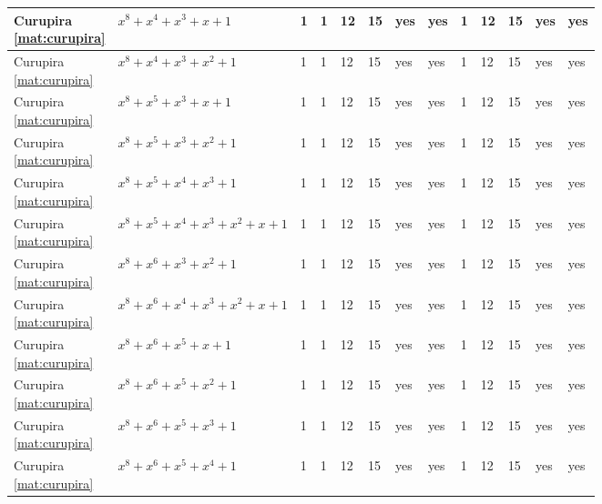 \begin{tiny}
\begin{longtable}{|l|l|l|l|l|l|l|l|l|l|l|l|l|}
\shortstack{Curupira \\ \eqref{mat:curupira}} & $x^8 + x^4 + x^3 + x + 1$ & 1 & 1 & 12 & 15 & yes & yes & 1 & 12 & 15 & yes & yes \\ \hline
\shortstack{Curupira \\ \eqref{mat:curupira}} & $x^8 + x^4 + x^3 + x^2 + 1$ & 1 & 1 & 12 & 15 & yes & yes & 1 & 12 & 15 & yes & yes \\ \hline
\shortstack{Curupira \\ \eqref{mat:curupira}} & $x^8 + x^5 + x^3 + x + 1$ & 1 & 1 & 12 & 15 & yes & yes & 1 & 12 & 15 & yes & yes \\ \hline
\shortstack{Curupira \\ \eqref{mat:curupira}} & $x^8 + x^5 + x^3 + x^2 + 1$ & 1 & 1 & 12 & 15 & yes & yes & 1 & 12 & 15 & yes & yes \\ \hline
\shortstack{Curupira \\ \eqref{mat:curupira}} & $x^8 + x^5 + x^4 + x^3 + 1$ & 1 & 1 & 12 & 15 & yes & yes & 1 & 12 & 15 & yes & yes \\ \hline
\shortstack{Curupira \\ \eqref{mat:curupira}} & $x^8 + x^5 + x^4 + x^3 + x^2 + x + 1$ & 1 & 1 & 12 & 15 & yes & yes & 1 & 12 & 15 & yes & yes \\ \hline
\shortstack{Curupira \\ \eqref{mat:curupira}} & $x^8 + x^6 + x^3 + x^2 + 1$ & 1 & 1 & 12 & 15 & yes & yes & 1 & 12 & 15 & yes & yes \\ \hline
\shortstack{Curupira \\ \eqref{mat:curupira}} & $x^8 + x^6 + x^4 + x^3 + x^2 + x + 1$ & 1 & 1 & 12 & 15 & yes & yes & 1 & 12 & 15 & yes & yes \\ \hline
\shortstack{Curupira \\ \eqref{mat:curupira}} & $x^8 + x^6 + x^5 + x + 1$ & 1 & 1 & 12 & 15 & yes & yes & 1 & 12 & 15 & yes & yes \\ \hline
\shortstack{Curupira \\ \eqref{mat:curupira}} & $x^8 + x^6 + x^5 + x^2 + 1$ & 1 & 1 & 12 & 15 & yes & yes & 1 & 12 & 15 & yes & yes \\ \hline
\shortstack{Curupira \\ \eqref{mat:curupira}} & $x^8 + x^6 + x^5 + x^3 + 1$ & 1 & 1 & 12 & 15 & yes & yes & 1 & 12 & 15 & yes & yes \\ \hline
\shortstack{Curupira \\ \eqref{mat:curupira}} & $x^8 + x^6 + x^5 + x^4 + 1$ & 1 & 1 & 12 & 15 & yes & yes & 1 & 12 & 15 & yes & yes \\ \hline

\end{longtable}
\end{tiny}
